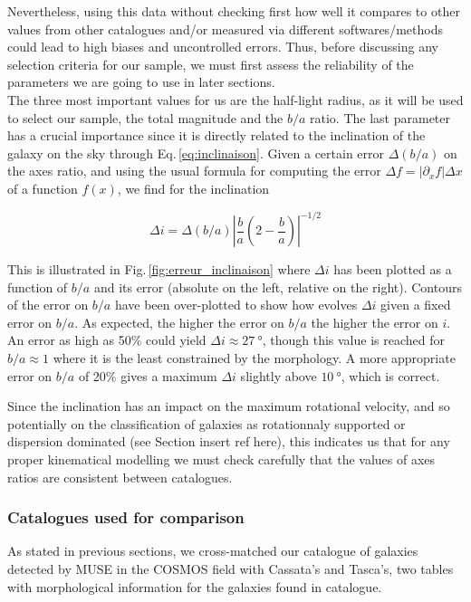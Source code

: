 Nevertheless, using this data without checking first how well it compares to other values from other catalogues and/or measured via different softwares/methods could lead to high biases and uncontrolled errors. Thus, before discussing any selection criteria for our sample, we must first assess the reliability of the parameters we are going to use in later sections. \\

The three most important values for us are the half-light radius, as it will be used to select our sample, the total magnitude and the $b/a$ ratio. The last parameter has a crucial importance since it is directly related to the inclination of the galaxy on the sky through Eq.\,\ref{eq:inclinaison}. Given a certain error $\Delta (b/a)$ on the axes ratio, and using the usual formula for computing the error $\Delta f = | \partial_x f | \Delta x$ of a function $f(x)$, we find for the inclination

\begin{equation}
	\Delta i = \Delta (b/a) \left | \frac{b}{a} \left ( 2 - \frac{b}{a} \right ) \right | ^{-1/2}
\end{equation}

This is illustrated in Fig.\,\ref{fig:erreur_inclinaison} where $\Delta i$ has been plotted as a function of $b/a$ and its error (absolute on the left, relative on the right). Contours of the error on $b/a$ have been over-plotted to show how evolves $\Delta i$ given a fixed error on $b/a$. As expected, the higher the error on $b/a$ the higher the error on $i$. An error as high as 50\% could yield $\Delta i \approx \SI{27}{\degree}$, though this value is reached for $b/a \approx 1$ where it is the least constrained by the morphology. A more appropriate error on $b/a$ of 20\% gives a maximum $\Delta i$ slightly above $\SI{10}{\degree}$, which is correct. 

Since the inclination has an impact on the maximum rotational velocity, and so potentially on the classification of galaxies as rotationnaly supported or dispersion dominated (see Section insert ref here), this indicates us that for any proper kinematical modelling we must check carefully that the values of axes ratios are consistent between catalogues.

\subsubsection{Catalogues used for comparison}

As stated in previous sections, we cross-matched our catalogue of galaxies detected by MUSE in the COSMOS field with Cassata's and Tasca's, two tables with morphological information for the galaxies found in  catalogue. 

